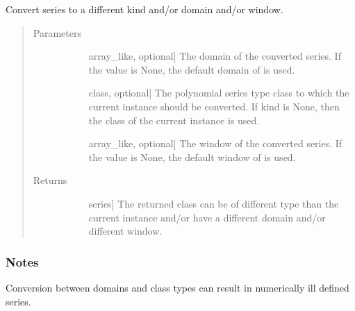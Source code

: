 \documentclass[letterpaper,10pt,english]{sphinxmanual}
\begin{document}
\begin{fulllineitems}
\begin{fulllineitems}
\label{\detokenize{generated/generated/numpy.polynomial.Polynomial.convert:numpy.polynomial.Polynomial.convert}}
Convert series to a different kind and/or domain and/or window.
\begin{quote}\begin{description}
\item[{Parameters}] \leavevmode\begin{description}
\item[{}] \leavevmode{[}array\_like, optional{]}
The domain of the converted series. If the value is None,
the default domain of  is used.

\item[{}] \leavevmode{[}class, optional{]}
The polynomial series type class to which the current instance
should be converted. If kind is None, then the class of the
current instance is used.

\item[{}] \leavevmode{[}array\_like, optional{]}
The window of the converted series. If the value is None,
the default window of  is used.

\end{description}

\item[{Returns}] \leavevmode\begin{description}
\item[{}] \leavevmode{[}series{]}
The returned class can be of different type than the current
instance and/or have a different domain and/or different
window.

\end{description}

\end{description}\end{quote}
\subsubsection*{Notes}

Conversion between domains and class types can result in
numerically ill defined series.


\end{fulllineitems}
\end{fulllineitems}
\end{document}
